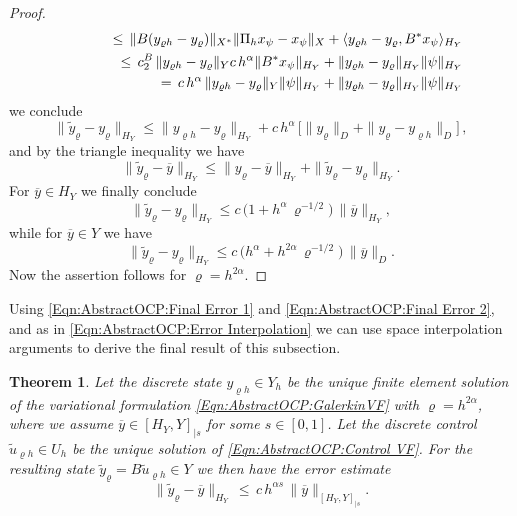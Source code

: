 \documentclass{article}
\newtheorem{theorem}{Theorem}
\numberwithin{equation}{section}
\begin{document}
\begin{proof}
\begin{eqnarray*}
  && \hspace*{1cm} \leq \, \| B (y_{\varrho h} - y_\varrho) \|_{X^*}
           \| \Pi_h x_\psi - x_\psi \|_X +
           \langle y_{\varrho h} - y_\varrho , B^* x_\psi \rangle_{H_Y} \\
  && \hspace*{1cm} \leq \, c_2^B \, \| y_{\varrho h} - y_\varrho \|_Y
     c \, h^\alpha \| B^* x_\psi \|_{H_Y} +
     \| y_{\varrho h} - y_\varrho \|_{H_Y}
     \| \psi \|_{H_Y} \\
  && \hspace*{1cm} = \, c \, h^\alpha \, \| y_{\varrho h} - y_\varrho \|_Y
     \| \psi \|_{H_Y} +
     \| y_{\varrho h} - y_\varrho \|_{H_Y}
     \| \psi \|_{H_Y}
\end{eqnarray*}
we conclude
\[
  \| \widetilde{y}_\varrho - y_\varrho \|_{H_Y} \leq
  \| y_{\varrho h} - y_\varrho \|_{H_Y} +
  c \, h^\alpha \, \Big[
  \| y_\varrho \|_D + \| y_\varrho - y_{\varrho h} \|_D
  \Big] \, ,
\]
and by the triangle inequality we have
\[
  \| \widetilde{y}_\varrho - \overline{y} \|_{H_Y} \leq
  \| y_\varrho - \overline{y} \|_{H_Y} +
  \| \widetilde{y}_\varrho - y_\varrho \|_{H_Y} .
\]
For $\overline{y} \in H_Y$ we finally conclude
\[
  \| \widetilde{y}_\varrho - y_\varrho \|_{H_Y} \leq
  c \, \Big( 1 + h^\alpha \, \varrho^{-1/2} \Big) \, \| \overline{y} \|_{H_Y} ,
\]
while for $\overline{y} \in Y$ we have
\[
  \| \widetilde{y}_\varrho - y_\varrho \|_{H_Y} \leq
  c \, \Big( h^\alpha + h^{2\alpha} \, \varrho^{-1/2} \Big)
  \, \| \overline{y} \|_D .
\]
Now the assertion follows for $\varrho = h^{2\alpha}$.
\end{proof}

\noindent
Using \eqref{Eqn:AbstractOCP:Final Error 1} and
\eqref{Eqn:AbstractOCP:Final Error 2}, and as
in \eqref{Eqn:AbstractOCP:Error Interpolation} we can use
space interpolation arguments to derive the final result of this
subsection.

\begin{theorem}
  Let the discrete state
  $y_{\varrho h} \in Y_h$ be the unique finite element solution of the
  variational formulation \eqref{Eqn:AbstractOCP:GalerkinVF} with
  $\varrho = h^{2\alpha}$, where we assume 
  $\overline{y} \in [H_Y,Y]_{|s}$ for some $s \in [0,1]$.
  Let the discrete control
  $\widetilde{u}_{\varrho h} \in U_h$ be the unique solution
  of \eqref{Eqn:AbstractOCP:Control VF}.
  For the resulting state
  $\widetilde{y}_\varrho = B \widetilde{u}_{\varrho h} \in Y$ we then
  have the error estimate
  \begin{equation}\label{Eqn:AbstractOCP:Final Error 3}
  \| \widetilde{y}_\varrho - \overline{y} \|_{H_Y} \, \leq \,
  c \, h^{\alpha s} \, \| \overline{y} \|_{[H_Y,Y]_{|s}} .
\end{equation}
\end{theorem}
\end{document}
